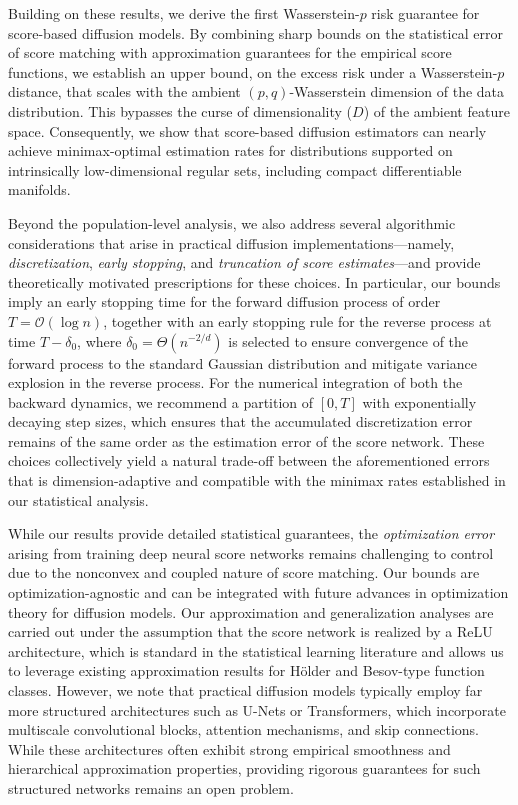 \documentclass[12pts]{article}
\newcommand{\cO}{ \mathcal{O}}
\begin{document}
Building on these results, we derive the first Wasserstein-$p$ risk guarantee for score-based diffusion models. By combining sharp bounds on the statistical error of score matching with approximation guarantees for the empirical score functions, we establish an upper bound, on the excess risk under a Wasserstein-$p$ distance, that scales with the ambient $(p,q)$-Wasserstein dimension of the data distribution. This bypasses the curse of dimensionality ($D$) of the ambient feature space. Consequently, we show that score-based diffusion estimators can nearly achieve minimax-optimal estimation rates for distributions supported on intrinsically low-dimensional regular sets, including compact differentiable manifolds.

Beyond the population-level analysis, we also address several algorithmic considerations that arise in practical diffusion implementations---namely, \emph{discretization}, \emph{early stopping}, and \emph{truncation of score estimates}---and provide theoretically motivated prescriptions for these choices. In particular, our bounds imply an early stopping time for the forward diffusion process of order $T = \cO(\log n)$, together with an early stopping rule for the reverse process at time $T - \delta_0$, where $\delta_0 = \Theta(n^{-2/ d})$ is selected to ensure convergence of the forward process to the standard Gaussian distribution and mitigate variance explosion in the reverse process. For the numerical integration of both the backward dynamics, we recommend a partition of $[0,T]$ with exponentially decaying step sizes, which ensures that the accumulated discretization error remains of the same order as the estimation error of the score network. These choices collectively yield a natural trade-off between the aforementioned errors that is dimension-adaptive and compatible with the minimax rates established in our statistical analysis.



While our results provide detailed statistical guarantees, the \emph{optimization error} arising from training deep neural score networks remains challenging to control due to the nonconvex and coupled nature of score matching. Our bounds are optimization-agnostic and can be integrated with future advances in optimization theory for diffusion models. Our approximation and generalization analyses are carried out under the assumption that the score network is realized by a ReLU architecture, which is standard in the statistical learning literature and allows us to leverage existing approximation results for H\"older and Besov-type function classes. However, we note that practical diffusion models typically employ far more structured architectures such as U-Nets or Transformers, which incorporate multiscale convolutional blocks, attention mechanisms, and skip connections. While these architectures often exhibit strong empirical smoothness and hierarchical approximation properties, providing rigorous guarantees for such structured networks remains an open problem. 
\end{document}
